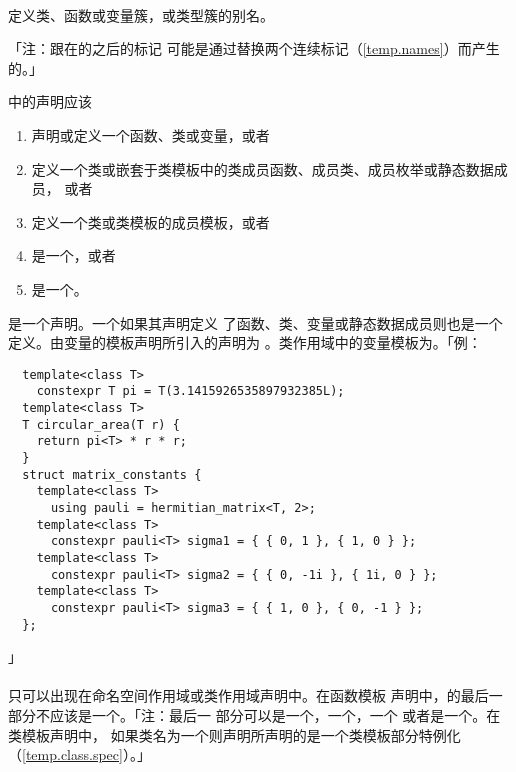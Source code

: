 
\paragraph{}
定义类、函数或变量簇，或类型簇的别名。


「注：跟在的之后的标记
\tm{>}可能是通过替换两个连续\tm{>}标记（\ref{temp.names}）而产生的。」

中的声明应该
\begin{enumerate}
  \item{声明或定义一个函数、类或变量，或者}
  \item{定义一个类或嵌套于类模板中的类成员函数、成员类、成员枚举或静态数据成员，
    或者}
  \item{定义一个类或类模板的成员模板，或者}
  \item{是一个，或者}
  \item{是一个。}
\end{enumerate}
是一个声明。一个如果其声明定义
了函数、类、变量或静态数据成员则也是一个定义。由变量的模板声明所引入的声明为
。类作用域中的变量模板为。「例：
\begin{lstlisting}
  template<class T>
    constexpr T pi = T(3.1415926535897932385L);
  template<class T>
  T circular_area(T r) {
    return pi<T> * r * r;
  }
  struct matrix_constants {
    template<class T>
      using pauli = hermitian_matrix<T, 2>;
    template<class T>
      constexpr pauli<T> sigma1 = { { 0, 1 }, { 1, 0 } };
    template<class T>
      constexpr pauli<T> sigma2 = { { 0, -1i }, { 1i, 0 } };
    template<class T>
      constexpr pauli<T> sigma3 = { { 1, 0 }, { 0, -1 } };
  };
\end{lstlisting}」

\paragraph{}
只可以出现在命名空间作用域或类作用域声明中。在函数模板
声明中，的最后一部分不应该是一个。「注：最后一
部分可以是一个，一个，一个
或者是一个。在类模板声明中，
如果类名为一个则声明所声明的是一个类模板部分特例化
（\ref{temp.class.spec}）。」

